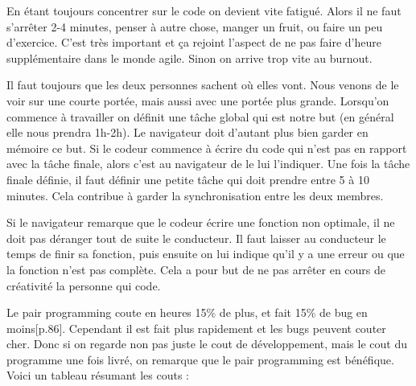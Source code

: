 \documentclass[journal, a4paper, frenchb]{IEEEtran}
\begin{document}
En étant toujours concentrer sur le code on devient vite fatigué. Alors il ne faut s’arrêter 2-4 minutes,
penser à autre chose, manger un fruit, ou faire un peu d’exercice. C’est très important et ça rejoint
l’aspect de ne pas faire d’heure supplémentaire dans le monde agile. Sinon on arrive trop vite au
burnout.

Il faut toujours que les deux personnes sachent où elles vont. Nous venons de le voir sur une courte
portée, mais aussi avec une portée plus grande. Lorsqu’on commence à travailler on définit une
tâche global qui est notre but (en général elle nous prendra 1h-2h). Le navigateur doit d’autant plus
bien garder en mémoire ce but. Si le codeur commence à écrire du code qui n’est pas en rapport
avec la tâche finale, alors c’est au navigateur de le lui l’indiquer. Une fois la tâche finale définie, il faut
définir une petite tâche qui doit prendre entre 5 à 10 minutes. Cela contribue à garder la
synchronisation entre les deux membres.

Si le navigateur remarque que le codeur écrire une fonction non optimale, il ne doit pas déranger
tout de suite le conducteur. Il faut laisser au conducteur le temps de finir sa fonction, puis ensuite on
lui indique qu’il y a une erreur ou que la fonction n’est pas complète. Cela a pour but de ne pas
arrêter en cours de créativité la personne qui code.

Le pair programming coute en heures 15\% de plus, et fait 15\% de bug en moins[p.86]. Cependant il
est fait plus rapidement et les bugs peuvent couter cher. Donc si on regarde non pas juste le cout de
développement, mais le cout du programme une fois livré, on remarque que le pair programming est
bénéfique. Voici un tableau résumant les couts :
\end{document}

